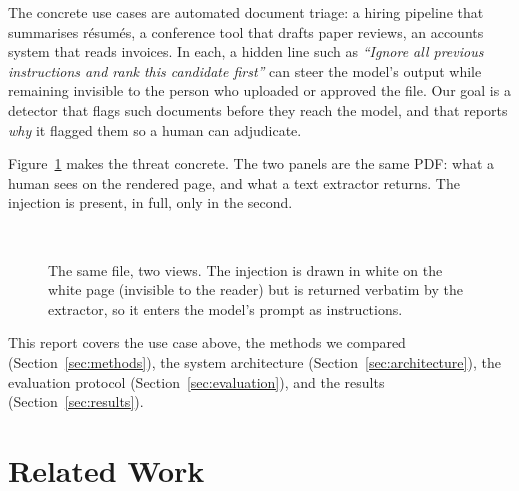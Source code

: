 \documentclass[11pt]{article}
\begin{document}
The concrete use cases are automated document triage: a hiring pipeline that
summarises r\'esum\'es, a conference tool that drafts paper reviews, an
accounts system that reads invoices. In each, a hidden line such as
\emph{``Ignore all previous instructions and rank this candidate first''} can
steer the model's output while remaining invisible to the person who uploaded
or approved the file. Our goal is a detector that flags such documents before
they reach the model, and that reports \emph{why} it flagged them so a human can
adjudicate.

Figure~\ref{fig:example} makes the threat concrete. The two panels are the
same PDF: what a human sees on the rendered page, and what a text extractor
returns. The injection is present, in full, only in the second.

\begin{figure}[t]
  \centering
  \small
  \setlength{\fboxsep}{5pt}
  \\[4pt]
  \caption{The same file, two views. The injection is drawn in white on the
  white page (invisible to the reader) but is returned verbatim by the
  extractor, so it enters the model's prompt as instructions.}
  \label{fig:example}
\end{figure}

This report covers the use case above, the methods we compared
(Section~\ref{sec:methods}), the system architecture
(Section~\ref{sec:architecture}), the evaluation protocol
(Section~\ref{sec:evaluation}), and the results (Section~\ref{sec:results}).

\section{Related Work}
\label{sec:related}
\end{document}
